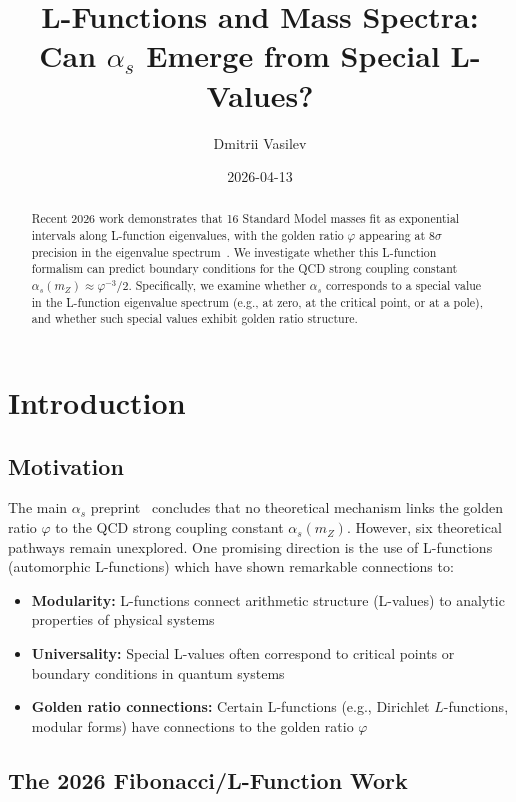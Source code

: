 \documentclass{article}
\title{L-Functions and Mass Spectra: Can $\alpha_s$ Emerge from Special L-Values?}
\author{Dmitrii Vasilev}
\date{2026-04-13}
\begin{document}
\maketitle

\begin{abstract}
Recent 2026 work demonstrates that 16 Standard Model masses fit as exponential intervals along L-function eigenvalues, with the golden ratio $\varphi$ appearing at $8\sigma$ precision in the eigenvalue spectrum~\cite{fibonaccimass2026}. We investigate whether this L-function formalism can predict boundary conditions for the QCD strong coupling constant $\alpha_s(m_Z) \approx \varphi^{-3}/2$. Specifically, we examine whether $\alpha_s$ corresponds to a special value in the L-function eigenvalue spectrum (e.g., at zero, at the critical point, or at a pole), and whether such special values exhibit golden ratio structure.
\end{abstract}

\section{Introduction}

\subsection{Motivation}

The main $\alpha_s$ preprint~\cite{alpha_s_preprint} concludes that no theoretical mechanism links the golden ratio $\varphi$ to the QCD strong coupling constant $\alpha_s(m_Z)$. However, six theoretical pathways remain unexplored. One promising direction is the use of L-functions (automorphic L-functions) which have shown remarkable connections to:

\begin{itemize}
  \item \textbf{Modularity:} L-functions connect arithmetic structure (L-values) to analytic properties of physical systems
  \item \textbf{Universality:} Special L-values often correspond to critical points or boundary conditions in quantum systems
  \item \textbf{Golden ratio connections:} Certain L-functions (e.g., Dirichlet $L$-functions, modular forms) have connections to the golden ratio $\varphi$
\end{itemize}

\subsection{The 2026 Fibonacci/L-Function Work}
\end{document}
